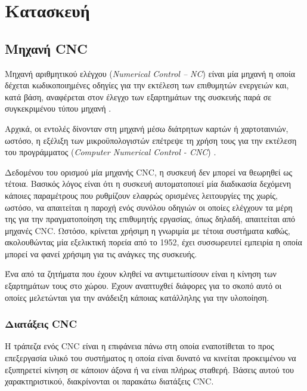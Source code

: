 \chapter{Κατασκευή}

\section{Μηχανή CNC}

Μηχανή αριθμητικού ελέγχου (\emph{Numerical Control -- NC}) είναι μία μηχανή η οποία δέχεται κωδικοποιημένες οδηγίες για την
εκτέλεση των επιθυμητών ενεργειών και, κατά βάση, αναφέρεται στον έλεγχο των
εξαρτημάτων της συσκευής παρά σε συγκεκριμένου τύπου μηχανή
\parencites{seames01}{albert11}.

Αρχικά, οι εντολές δίνονταν στη μηχανή μέσω διάτρητων καρτών ή χαρτοταινιών,
ωστόσο, η εξέλιξη των μικροϋπολογιστών επέτρεψε τη χρήση τους για την εκτέλεση
του προγράμματος (\emph{Computer Numerical Control - CNC}) \parencite{seames01}.


Δεδομένου του ορισμού μία μηχανής CNC, η συσκευή δεν μπορεί να θεωρηθεί ως
τέτοια. Βασικός λόγος είναι ότι η συσκευή αυτοματοποιεί μία διαδικασία δεχόμενη
κάποιες παραμέτρους που ρυθμίζουν ελαφρώς ορισμένες λειτουργίες της χωρίς,
ωστόσο, να απαιτείται η παροχή ενός συνόλου οδηγιών οι οποίες ελέγχουν τα μέρη
της για την πραγματοποίηση της επιθυμητής εργασίας, όπως δηλαδή, απαιτείται από
μηχανές CNC.
Ωστόσο, κρίνεται χρήσιμη η γνωριμία με τέτοια συστήματα καθώς, ακολουθώντας μία
εξελικτική πορεία από το 1952, έχει συσσωρευτεί εμπειρία η οποία μπορεί να φανεί
χρήσιμη για τις ανάγκες της συσκευής.

Ένα από τα ζητήματα που έχουν κληθεί να αντιμετωπίσουν είναι η κίνηση των
εξαρτημάτων τους στο χώρου. Έχουν αναπτυχθεί διάφορες για το σκοπό αυτό οι
οποίες μελετώνται για την ανάδειξη κάποιας κατάλληλης για την υλοποίηση.

\subsection{Διατάξεις CNC}

Η τράπεζα ενός CNC είναι η επιφάνεια πάνω στη οποία εναποτίθεται το προς
επεξεργασία υλικό του συστήματος η οποία είναι δυνατό να κινείται προκειμένου να
εξυπηρετεί κίνηση σε κάποιον άξονα ή να είναι πλήρως σταθερή. Βάσεις αυτού του
χαρακτηριστικού, διακρίνονται οι παρακάτω διατάξεις CNC.

